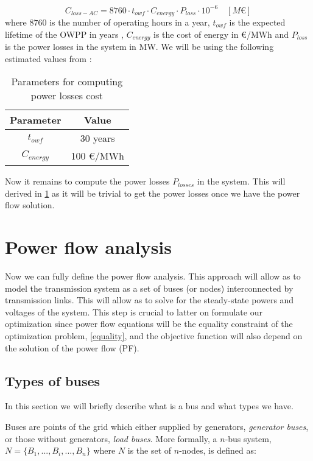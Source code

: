 \documentclass[a4paper,11pt, titlepage, twoside]{article}
\begin{document}
\begin{equation}\label{eq:lossescost}
    C_{loss-AC} = 8760 \cdot t_{owf} \cdot C_{energy} \cdot P_{loss} \cdot 10^{-6} \quad \left[M\euro\right]
\end{equation}
where $8760$ is the number of operating hours in a year, $t_{owf}$ is the expected lifetime of the OWPP in years , $C_{energy}$ is the cost of energy in \euro/MWh and $P_{loss}$ is the power losses in the system in MW. We will be using the
following estimated values from \cite{paperbase}:
\begin{table}[h]
    \centering
    \begin{tabular}{c|c}
    \hline
    \textbf{Parameter} & \textbf{Value} \\
    \hline
    $t_{owf}$ & 30 years \\ 
    $C_{energy}$ & 100 \euro/MWh  \\
    \hline
    \end{tabular}
    \caption{Parameters for computing power losses cost \cite{paperbase}}
    \label{tab:lossescost}
\end{table}

Now it remains to compute the power losses $P_{losses}$ in the system. This will derived in \ref{fulltransmission} as it will be trivial to get
the power losses once we have the power flow solution.

\section{Power flow analysis} \label{fulltransmission}

Now we can fully define the power flow analysis.  This approach will allow as to model the transmission system as a set of buses (or nodes)
interconnected by transmission links. This will allow as to solve for the steady-state powers and voltages of the system. This step is crucial to latter on
formulate our optimization since power flow equations will be the equality constraint of the optimization problem, \ref{equality}, and the objective function will also depend on the solution of the power flow (PF).

\subsection{Types of buses}

In this section we will briefly describe what is a bus and what types we have.\par
Buses are points of the grid which either supplied by generators, \textit{generator buses}, or those without generators, \textit{load buses}. More formally, a $n$-bus system, $N=\{B_1,...,B_i,...,B_n\}$ where $N$ is the set of $n$-nodes, is defined as:
\end{document}
